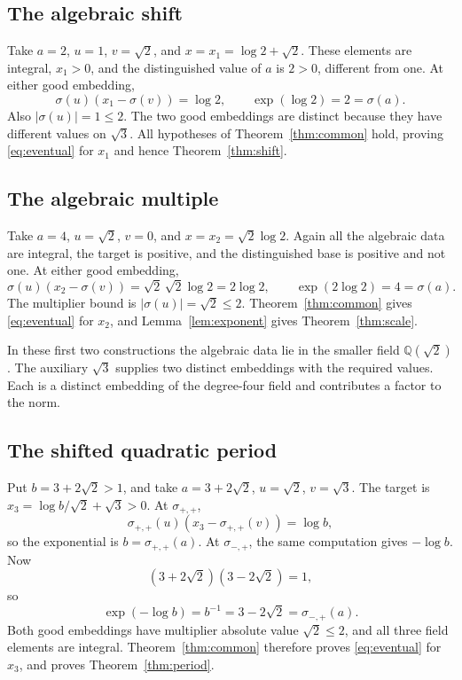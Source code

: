 \documentclass[11pt]{article}
\theoremstyle{definition}
\theoremstyle{remark}
\theoremstyle{plain}
\newcommand{\Q}{\mathbb Q}
\begin{document}
\subsection{The algebraic shift}
Take \(a=2\), \(u=1\), \(v=\sqrt2\), and
\(x=x_1=\log2+\sqrt2\). These elements are integral, \(x_1>0\), and
the distinguished value of \(a\) is \(2>0\), different from one.
At either good embedding,
\[
 \sigma(u)(x_1-\sigma(v))=\log2,
 \qquad \exp(\log2)=2=\sigma(a).
\]
Also \(|\sigma(u)|=1\le2\). The two good embeddings are distinct
because they have different values on \(\sqrt3\). All hypotheses of
Theorem~\ref{thm:common} hold, proving \eqref{eq:eventual} for \(x_1\)
and hence Theorem~\ref{thm:shift}.

\subsection{The algebraic multiple}
Take \(a=4\), \(u=\sqrt2\), \(v=0\), and
\(x=x_2=\sqrt2\log2\). Again all the algebraic data are integral,
the target is positive, and the distinguished base is positive and not
one. At either good embedding,
\[
 \sigma(u)(x_2-\sigma(v))=\sqrt2\,\sqrt2\log2=2\log2,
 \qquad \exp(2\log2)=4=\sigma(a).
\]
The multiplier bound is \(|\sigma(u)|=\sqrt2\le2\).
Theorem~\ref{thm:common} gives \eqref{eq:eventual} for \(x_2\), and
Lemma~\ref{lem:exponent} gives Theorem~\ref{thm:scale}.

In these first two constructions the algebraic data lie in the smaller
field \(\Q(\sqrt2)\). The auxiliary \(\sqrt3\) supplies two distinct
embeddings with the required values. Each is a distinct embedding of the
degree-four field and contributes a factor to the norm.

\subsection{The shifted quadratic period}
Put \(b=3+2\sqrt2>1\), and take \(a=3+2\sqrt2\),
\(u=\sqrt2\), \(v=\sqrt3\). The target is
\(x_3=\log b/\sqrt2+\sqrt3>0\). At \(\sigma_{+,+}\),
\[
 \sigma_{+,+}(u)(x_3-\sigma_{+,+}(v))=\log b,
\]
so the exponential is \(b=\sigma_{+,+}(a)\).
At \(\sigma_{-,+}\), the same computation gives \(-\log b\).
Now
\begin{equation}\label{eq:unit}
 (3+2\sqrt2)(3-2\sqrt2)=1,
\end{equation}
so
\[
 \exp(-\log b)=b^{-1}=3-2\sqrt2=\sigma_{-,+}(a).
\]
Both good embeddings have multiplier absolute value \(\sqrt2\le2\),
and all three field elements are integral. Theorem~\ref{thm:common}
therefore proves \eqref{eq:eventual} for \(x_3\), and proves
Theorem~\ref{thm:period}.
\end{document}
